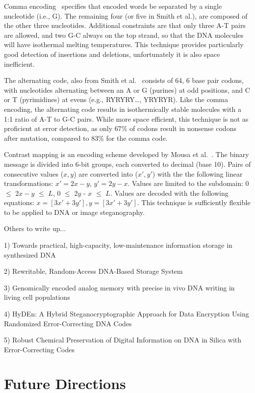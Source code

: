 \documentclass[USenglish,oneside,twocolumn]{article}
\begin{document}
Comma encoding~\cite{BVSPNAS2000} specifies that encoded words be separated by a single nucleotide (i.e., G). The remaining four (or five in Smith et al.), are composed of the other three nucleotides. Additional constraints are that only three A-T pairs are allowed, and two G-C always on the top strand, so that the DNA molecules will have isothermal melting temperatures. This technique provides particularly good detection of insertions and deletions, unfortunately it is also space inefficient.

The alternating code, also from Smith et al.~\cite{SFHC2003BL} consists of 64, 6 base pair codons, with nucleotides alternating between an A or G (purines) at odd positions, and C or T (pyrimidines) at evens (e.g., RYRYRY…, YRYRYR). Like the comma encoding, the alternating code results in isothermically stable molecules with a 1:1 ratio of A-T to G-C pairs. While more space efficient, this technique is not as proficient at error detection, as only 67\% of codons result in nonsense codons after mutation, compared to 83\% for the comma code.

Contrast mapping is an encoding scheme developed by Mousa et al.~\cite{MMAIAJI2011}. The binary message is divided into 6-bit groups, each converted to decimal (base 10). Pairs of consecutive values ($x, y$) are converted into ($x', y'$) with the the following linear transformations: $x' = 2x - y$,  $y' = 2y - x$. Values are limited to the subdomain:  0 $\leq$ 2$x - y$ $\leq$ $L$, 0 $\leq$ 2$y$ - $x$ $\leq$ $L$. Values are decoded with the following equations: $x = [3x' + 3y'], y = [3 x' + 3y']$. This technique is sufficiently flexible to be applied to DNA or image steganography.

Others to write up...

1) Towards practical, high-capacity, low-maintenance
information storage in synthesized DNA

2) Rewritable, Random-Access DNA-Based Storage System

3) Genomically encoded analog memory with precise in vivo DNA writing in living cell populations

4) HyDEn: A Hybrid Steganocryptographic Approach for Data Encryption Using Randomized Error-Correcting DNA Codes

5) Robust Chemical Preservation of Digital Information on DNA in Silica with Error-Correcting Codes




\section{Future Directions}
\end{document}
